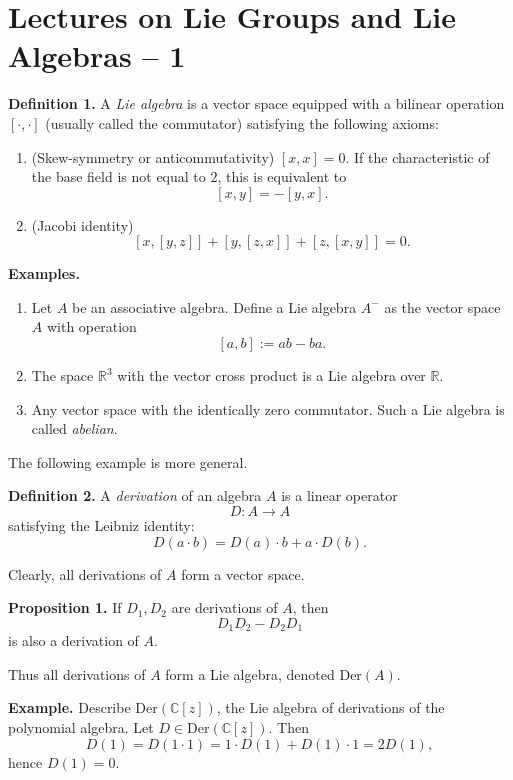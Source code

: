 \section*{Lectures on Lie Groups and Lie Algebras – 1}

\textbf{Definition 1.}
A \emph{Lie algebra} is a vector space equipped with a bilinear operation 
$[\cdot,\cdot]$ (usually called the commutator) satisfying the following axioms:

\begin{enumerate}
\item (Skew-symmetry or anticommutativity) $[x,x] = 0$.
If the characteristic of the base field is not equal to $2$, this is equivalent to
\[
[x,y] = -[y,x].
\]

\item (Jacobi identity)
\[
[x,[y,z]] + [y,[z,x]] + [z,[x,y]] = 0.
\]
\end{enumerate}

\textbf{Examples.}

\begin{enumerate}
\item Let $A$ be an associative algebra. Define a Lie algebra $A^{-}$ as the vector space $A$
with operation
\[
[a,b] := ab - ba.
\]

\item The space $\mathbb{R}^3$ with the vector cross product is a Lie algebra over $\mathbb{R}$.

\item Any vector space with the identically zero commutator.
Such a Lie algebra is called \emph{abelian}.
\end{enumerate}

The following example is more general.

\textbf{Definition 2.}
A \emph{derivation} of an algebra $A$ is a linear operator
\[
D: A \to A
\]
satisfying the Leibniz identity:
\[
D(a\cdot b) = D(a)\cdot b + a\cdot D(b).
\]

Clearly, all derivations of $A$ form a vector space.

\textbf{Proposition 1.}
If $D_1, D_2$ are derivations of $A$, then
\[
D_1D_2 - D_2D_1
\]
is also a derivation of $A$.

Thus all derivations of $A$ form a Lie algebra, denoted $\mathrm{Der}(A)$.

\textbf{Example.}
Describe $\mathrm{Der}(\mathbb{C}[z])$, the Lie algebra of derivations of the polynomial algebra.
Let $D \in \mathrm{Der}(\mathbb{C}[z])$. Then
\[
D(1) = D(1\cdot 1) = 1\cdot D(1) + D(1)\cdot 1 = 2D(1),
\]
hence $D(1) = 0$.

